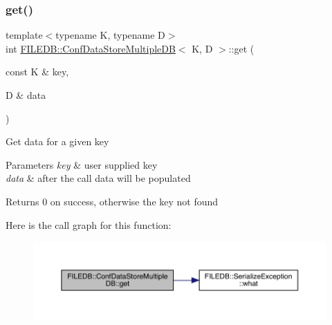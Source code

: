 \subsubsection{\texorpdfstring{get()}{get()}\hspace{0.1cm}{\footnotesize\ttfamily [3/3]}}
{\footnotesize\ttfamily template$<$typename K, typename D$>$ \\
int \mbox{\hyperlink{classFILEDB_1_1ConfDataStoreMultipleDB}{F\+I\+L\+E\+D\+B\+::\+Conf\+Data\+Store\+Multiple\+DB}}$<$ K, D $>$\+::get (\begin{DoxyParamCaption}\item[{const K \&}]{key,  }\item[{D \&}]{data }\end{DoxyParamCaption})\hspace{0.3cm}{\ttfamily [inline]}}

Get data for a given key 
\begin{DoxyParams}{Parameters}
{\em key} & user supplied key \\
\hline
{\em data} & after the call data will be populated \\
\hline
\end{DoxyParams}
\begin{DoxyReturn}{Returns}
0 on success, otherwise the key not found 
\end{DoxyReturn}
Here is the call graph for this function\+:
\nopagebreak
\begin{figure}[H]
\begin{center}
\leavevmode
\includegraphics[width=350pt]{d3/dc0/classFILEDB_1_1ConfDataStoreMultipleDB_a15c985c05120d6076e890f0507ceade7_cgraph}
\end{center}
\end{figure}
\mbox{\label{classFILEDB_1_1ConfDataStoreMultipleDB_a56fefab208c1b4abc3139afb38035a13}} 
